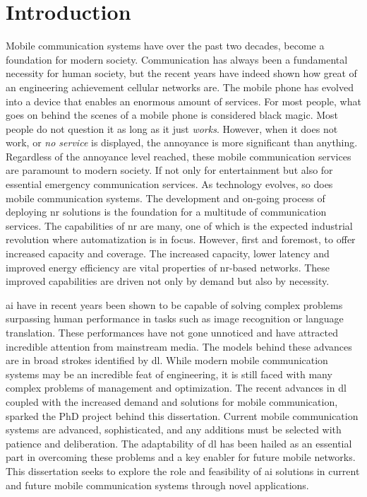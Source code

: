 \chapter*{Introduction}\label{ch:introduction}
Mobile communication systems have over the past two decades, become a foundation for modern society. Communication has always been a fundamental necessity for human society, but the recent years have indeed shown how great of an engineering achievement cellular networks are. The mobile phone has evolved into a device that enables an enormous amount of services. For most people, what goes on behind the scenes of a mobile phone is considered black magic. Most people do not question it as long as it just \emph{works}. However, when it does not work, or \emph{no service} is displayed, the annoyance is more significant than anything. Regardless of the annoyance level reached, these mobile communication services are paramount to modern society. If not only for entertainment but also for essential emergency communication services. As technology evolves, so does mobile communication systems. The development and on-going process of deploying \gls{nr} solutions is the foundation for a multitude of communication services. The capabilities of \gls{nr} are many, one of which is the expected industrial revolution where automatization is in focus. However, first and foremost, to offer increased capacity and coverage. The increased capacity, lower latency and improved energy efficiency are vital properties of \gls{nr}-based networks. These improved capabilities are driven not only by demand but also by necessity. 

\gls{ai} have in recent years been shown to be capable of solving complex problems surpassing human performance in tasks such as image recognition or language translation. These performances have not gone unnoticed and have attracted incredible attention from mainstream media. The models behind these advances are in broad strokes identified by \acrfull{dl}. While modern mobile communication systems may be an incredible feat of engineering, it is still faced with many complex problems of management and optimization. The recent advances in \acrlong{dl} coupled with the increased demand and solutions for mobile communication, sparked the PhD project behind this dissertation. Current mobile communication systems are advanced, sophisticated, and any additions must be selected with patience and deliberation. The adaptability of \acrlong{dl} has been hailed as an essential part in overcoming these problems and a key enabler for future mobile networks. This dissertation seeks to explore the role and feasibility of \gls{ai} solutions in current and future mobile communication systems through novel applications. 


